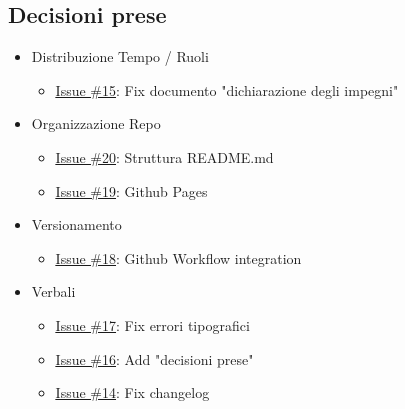 \documentclass[10pt]{article}
\begin{document}
\subsection{Decisioni prese}

\begin{itemize}
\item Distribuzione Tempo / Ruoli
    \begin{itemize}
        \item \href{https://github.com/techminds-unipd/docs/issues/15}{\underline {Issue \#15}}: 
        Fix documento "dichiarazione degli impegni"  
    \end{itemize}
    \item  Organizzazione Repo
    \begin{itemize}
        \item \href{https://github.com/techminds-unipd/docs/issues/20}{\underline {Issue \#20}}: 
        Struttura README.md
        
       
        \item \href{https://github.com/techminds-unipd/docs/issues/19}{\underline {Issue \#19}}: Github Pages 
    \end{itemize}
    \item Versionamento
    \begin{itemize}
        \item \href{https://github.com/techminds-unipd/docs/issues/18}{\underline {Issue \#18}}: 
        Github Workflow integration 
    \end{itemize}
    \item Verbali
    \begin{itemize}
        \item \href{https://github.com/techminds-unipd/docs/issues/17}{\underline {Issue \#17}}: 
        Fix errori tipografici
        \item \href{https://github.com/techminds-unipd/docs/issues/16}{\underline {Issue \#16}}: 
        Add "decisioni prese" 
        \item \href{https://github.com/techminds-unipd/docs/issues/14}{\underline {Issue \#14}}: 
        Fix changelog
    \end{itemize}
\end{itemize}
\end{document}
